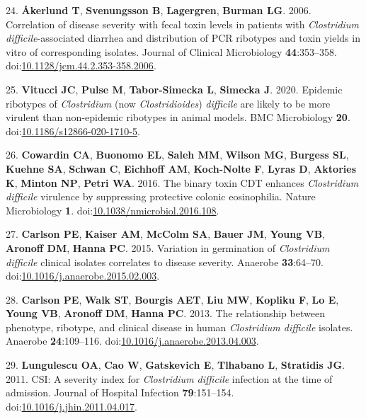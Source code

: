 \documentclass[
  12pt,
]{article}
\newenvironment{cslreferences}%
  {}%
  {\par}
\begin{document}
\begin{cslreferences}
\leavevmode\hypertarget{ref-Akerlund2006}{}%
24. \textbf{Åkerlund T}, \textbf{Svenungsson B}, \textbf{Lagergren},
\textbf{Burman LG}. 2006. Correlation of disease severity with fecal
toxin levels in patients with \emph{Clostridium difficile}-associated
diarrhea and distribution of PCR ribotypes and toxin yields in vitro of
corresponding isolates. Journal of Clinical Microbiology
\textbf{44}:353--358.
doi:\href{https://doi.org/10.1128/jcm.44.2.353-358.2006}{10.1128/jcm.44.2.353-358.2006}.

\leavevmode\hypertarget{ref-Vitucci2020}{}%
25. \textbf{Vitucci JC}, \textbf{Pulse M}, \textbf{Tabor-Simecka L},
\textbf{Simecka J}. 2020. Epidemic ribotypes of \emph{Clostridium} (now
\emph{Clostridioides}) \emph{difficile} are likely to be more virulent
than non-epidemic ribotypes in animal models. BMC Microbiology
\textbf{20}.
doi:\href{https://doi.org/10.1186/s12866-020-1710-5}{10.1186/s12866-020-1710-5}.

\leavevmode\hypertarget{ref-Cowardin2016}{}%
26. \textbf{Cowardin CA}, \textbf{Buonomo EL}, \textbf{Saleh MM},
\textbf{Wilson MG}, \textbf{Burgess SL}, \textbf{Kuehne SA},
\textbf{Schwan C}, \textbf{Eichhoff AM}, \textbf{Koch-Nolte F},
\textbf{Lyras D}, \textbf{Aktories K}, \textbf{Minton NP}, \textbf{Petri
WA}. 2016. The binary toxin CDT enhances \emph{Clostridium difficile}
virulence by suppressing protective colonic eosinophilia. Nature
Microbiology \textbf{1}.
doi:\href{https://doi.org/10.1038/nmicrobiol.2016.108}{10.1038/nmicrobiol.2016.108}.

\leavevmode\hypertarget{ref-Carlson2015}{}%
27. \textbf{Carlson PE}, \textbf{Kaiser AM}, \textbf{McColm SA},
\textbf{Bauer JM}, \textbf{Young VB}, \textbf{Aronoff DM}, \textbf{Hanna
PC}. 2015. Variation in germination of \emph{Clostridium difficile}
clinical isolates correlates to disease severity. Anaerobe
\textbf{33}:64--70.
doi:\href{https://doi.org/10.1016/j.anaerobe.2015.02.003}{10.1016/j.anaerobe.2015.02.003}.

\leavevmode\hypertarget{ref-Carlson2013}{}%
28. \textbf{Carlson PE}, \textbf{Walk ST}, \textbf{Bourgis AET},
\textbf{Liu MW}, \textbf{Kopliku F}, \textbf{Lo E}, \textbf{Young VB},
\textbf{Aronoff DM}, \textbf{Hanna PC}. 2013. The relationship between
phenotype, ribotype, and clinical disease in human \emph{Clostridium
difficile} isolates. Anaerobe \textbf{24}:109--116.
doi:\href{https://doi.org/10.1016/j.anaerobe.2013.04.003}{10.1016/j.anaerobe.2013.04.003}.

\leavevmode\hypertarget{ref-Lungulescu2011}{}%
29. \textbf{Lungulescu OA}, \textbf{Cao W}, \textbf{Gatskevich E},
\textbf{Tlhabano L}, \textbf{Stratidis JG}. 2011. CSI: A severity index
for \emph{Clostridium difficile} infection at the time of admission.
Journal of Hospital Infection \textbf{79}:151--154.
doi:\href{https://doi.org/10.1016/j.jhin.2011.04.017}{10.1016/j.jhin.2011.04.017}.


\end{cslreferences}
\end{document}
